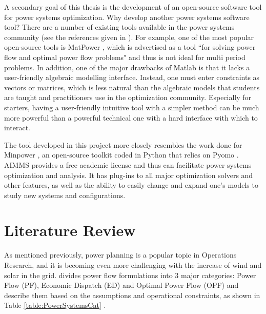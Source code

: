 \documentclass[12pt,LUDisStyle,twosided]{book}
\begin{document}
A secondary goal of this thesis is the development of an open-source software tool for power systems optimization. Why develop another power systems software tool? There are a number of existing tools available in the power systems community (see the references given in \cite{greenhall:2012}). For example, one of the most popular open-source tools is MatPower \cite{matpower:2011}, which is advertised as a tool ``for solving power flow and optimal power flow problems" and thus is not ideal for multi period problems. In addition, one of the major drawbacks of Matlab is that it lacks a user-friendly algebraic modelling interface.  Instead, one must enter constraints as vectors or matrices, which is less natural than the algebraic models that students are taught and practitioners use in the optimization community. Especially for starters, having a user-friendly intuitive tool with a simpler method can be much more powerful than a powerful technical one with a hard interface with which to interact.

The tool developed in this project more closely resembles the work done for Minpower \cite{greenhall:2012},
an open-source toolkit coded in Python that relies on Pyomo \cite{pyomo:2012}. AIMMS provides a free academic license and thus can facilitate power systems optimization and analysis.
It has plug-ins to all major optimization solvers and other features, as well as the ability to easily change and expand one's models to study new systems and configurations.

\chapter{Literature Review}

As mentioned previously, power planning is a popular topic in Operations Research, and it is becoming even more challenging with the increase of wind and solar in the grid. \citeauthor{cain} \cite{cain} divides power flow formulations into 3 major categories: Power Flow (PF), Economic Dispatch (ED) and Optimal Power Flow (OPF) and describe them based on the assumptions and operational constraints, as shown in Table \ref{table:PowerSystemsCat} .
\end{document}
